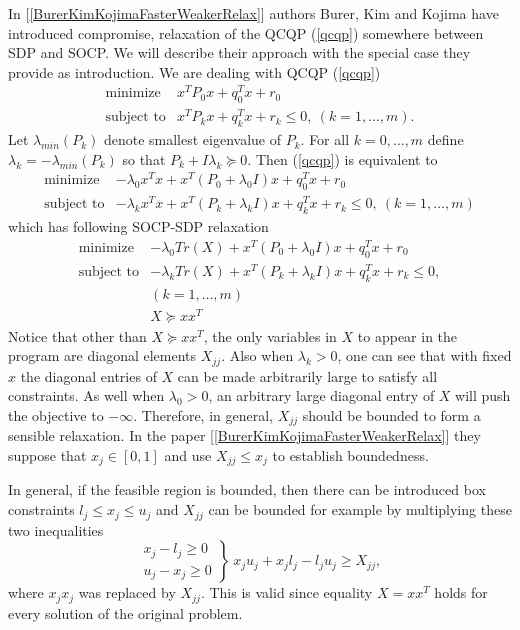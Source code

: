 \documentclass[12pt]{book}
\theoremstyle{definition}
\begin{document}
In [\ref{BurerKimKojimaFasterWeakerRelax}] authors Burer, Kim and Kojima have introduced compromise, relaxation of the QCQP (\ref{qcqp}) somewhere between SDP and SOCP. We will describe their approach with the special case they provide as introduction.
We are dealing with QCQP (\ref{qcqp})
\begin{equation}
\begin{array}{ll}
\mbox{minimize}& x^TP_0x + q_0^Tx + r_0 \\
\mbox{subject to}& x^TP_kx + q_k^Tx + r_k \leq 0, \  (k = 1,\dots ,m).
\end{array} 
\end{equation}
Let  $\lambda_{min}(P_k)$ denote smallest eigenvalue of $P_k$.
For all $k=0,\dots ,m$ define $\lambda_k=-\lambda_{min}(P_k)$ so that $P_k + I\lambda_k\succeq 0$. Then (\ref{qcqp}) is equivalent to 
\begin{equation}
\begin{array}{ll}
\mbox{minimize}& -\lambda_0 x^Tx +  x^T(P_0+\lambda_0 I)x + q_0^Tx + r_0\\
\mbox{subject to}& -\lambda_kx^Tx +  x^T(P_k+\lambda_kI)x + q_k^Tx + r_k \leq 0, \  (k = 1,\dots ,m)
\end{array} 
\end{equation}
which has following SOCP-SDP relaxation
\begin{equation}
\label{InBetweenSOCPSDP1}
\begin{array}{ll}
\mbox{minimize}& -\lambda_0 Tr(X) +  x^T(P_0+\lambda_0 I)x + q_0^Tx +r_0 \\
\mbox{subject to}& -\lambda_k Tr(X) +  x^T(P_k+\lambda_kI)x + q_k^Tx + r_k \leq 0, \\  
&(k = 1,\dots ,m) \\
& X\succeq xx^T
\end{array} 
\end{equation}
Notice that other than $X\succeq xx^T$, the only variables in $X$ to appear in the program are diagonal elements $X_{jj}$.
Also when $\lambda_k>0$, one can see that with fixed $x$ the diagonal entries of $X$ can be made arbitrarily large to satisfy all constraints. As well when $\lambda_0>0$, an arbitrary large diagonal entry of $X$ will push the objective to $-\infty .$ Therefore, in general, $X_{jj}$ should be bounded to form a sensible relaxation. In the paper [\ref{BurerKimKojimaFasterWeakerRelax}] they suppose that $x_j\in [0,1]$ and use $X_{jj}\leq x_j$ to establish boundedness. 

\rem In general, if the feasible region is bounded, then there can be introduced box constraints $l_j\leq x_j \leq u_j$ and $X_{jj}$ can be bounded for example by multiplying these two inequalities 
\begin{equation}
\left.\begin{array}{r}
x_j - l_j \geq 0\\
u_j - x_j \geq 0
\end{array}\right\rbrace \
x_ju_j + x_jl_j - l_ju_j \geq X_{jj},
\end{equation} 
where $x_jx_j$ was replaced by $X_{jj}$. This is valid since equality $X = xx^T$ holds for every solution of the original problem. 
\medskip
\end{document}
